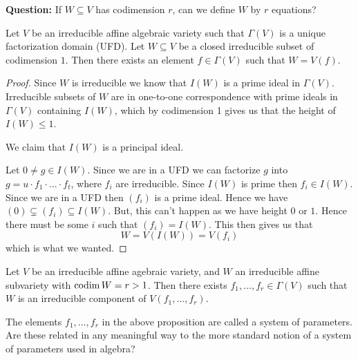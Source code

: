 \textbf{Question:} If $W\subseteq V$ has codimension $r$, can we define $W$ by $r$ equations? 

\begin{proposition}
Let $V$ be an irreducible affine algebraic variety such that $\Gamma(V)$ is a unique factorization domain (UFD). Let $W\subseteq V$ be a closed irreducible subset of codimension $1$. Then there exists an element $f\in \Gamma(V)$ such that $W=V(f)$. 
\end{proposition}
\begin{proof}
Since $W$ is irreducible we know that $I(W)$ is a prime ideal in $\Gamma(V)$. Irreducible subsets of $W$ are in one-to-one correspondence with prime ideals in $\Gamma(V)$ containing $I(W)$, which by codimension 1 gives us that the height of $I(W)\leq 1$. 

We claim that $I(W)$ is a principal ideal. 

Let $0\neq g\in I(W)$. Since we are in a UFD we can factorize $g$ into $g=u\cdot f_1\cdot \ldots \cdot f_t$, where $f_i$ are irreducible. Since $I(W)$ is prime then $f_i\in I(W)$. Since we are in a UFD then $(f_i)$ is a prime ideal. Hence we have $(0)\subsetneq (f_i)\subseteq I(W)$. But, this can't happen as we have height $0$ or $1$. Hence there must be some $i$ such that $(f_i)=I(W)$. This then gives us that 
\begin{equation*}
    W = V(I(W))=V(f_i)
\end{equation*}
which is what we wanted. 
\end{proof}

\begin{proposition}
Let $V$ be an irreducible affine agebraic variety, and $W$ an irreducible affine subvariety with $\operatorname{codim} W = r>1$. Then there exists $f_1, \ldots, f_r\in \Gamma(V)$ such that $W$ is an irreducible component of $V(f_1, \ldots, f_r)$.
\end{proposition}

\begin{problem}
The elements $f_1, \ldots, f_r$ in the above proposition are called a system of parameters. Are these related in any meaningful way to the more standard notion of a system of parameters used in algebra? 
\end{problem}